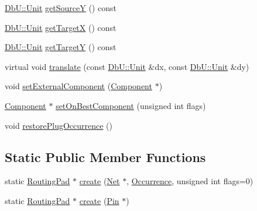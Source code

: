 \begin{DoxyCompactItemize}
\item 
\mbox{\hyperlink{group__DbUGroup_ga4fbfa3e8c89347af76c9628ea06c4146}{Db\+U\+::\+Unit}} \mbox{\hyperlink{classHurricane_1_1RoutingPad_a75983ff3507f4cbf2aaa4e3132eac987}{get\+SourceY}} () const
\item 
\mbox{\hyperlink{group__DbUGroup_ga4fbfa3e8c89347af76c9628ea06c4146}{Db\+U\+::\+Unit}} \mbox{\hyperlink{classHurricane_1_1RoutingPad_a3c0f5056b20515d308c2945ab692bce5}{get\+TargetX}} () const
\item 
\mbox{\hyperlink{group__DbUGroup_ga4fbfa3e8c89347af76c9628ea06c4146}{Db\+U\+::\+Unit}} \mbox{\hyperlink{classHurricane_1_1RoutingPad_a41a9c831d668377fc0c5e628f66465a0}{get\+TargetY}} () const
\item 
virtual void \mbox{\hyperlink{classHurricane_1_1RoutingPad_a41bf66ffda0c0ceaaebc67acd72d5b36}{translate}} (const \mbox{\hyperlink{group__DbUGroup_ga4fbfa3e8c89347af76c9628ea06c4146}{Db\+U\+::\+Unit}} \&dx, const \mbox{\hyperlink{group__DbUGroup_ga4fbfa3e8c89347af76c9628ea06c4146}{Db\+U\+::\+Unit}} \&dy)
\item 
void \mbox{\hyperlink{classHurricane_1_1RoutingPad_a9f448ad4f05f6995edc4a5ab50501586}{set\+External\+Component}} (\mbox{\hyperlink{classHurricane_1_1Component}{Component}} $\ast$)
\item 
\mbox{\hyperlink{classHurricane_1_1Component}{Component}} $\ast$ \mbox{\hyperlink{classHurricane_1_1RoutingPad_a410992ef75c40f9a898c36f39a7d1a1a}{set\+On\+Best\+Component}} (unsigned int flags)
\item 
void \mbox{\hyperlink{classHurricane_1_1RoutingPad_a1fcb0951f5f9505c6978bf498f78fce9}{restore\+Plug\+Occurrence}} ()
\end{DoxyCompactItemize}
\subsection*{Static Public Member Functions}
\begin{DoxyCompactItemize}
\item 
static \mbox{\hyperlink{classHurricane_1_1RoutingPad}{Routing\+Pad}} $\ast$ \mbox{\hyperlink{classHurricane_1_1RoutingPad_a87c3a286477f81b9c791dc24104a3e51}{create}} (\mbox{\hyperlink{classHurricane_1_1Net}{Net}} $\ast$, \mbox{\hyperlink{classHurricane_1_1Occurrence}{Occurrence}}, unsigned int flags=0)
\item 
static \mbox{\hyperlink{classHurricane_1_1RoutingPad}{Routing\+Pad}} $\ast$ \mbox{\hyperlink{classHurricane_1_1RoutingPad_a1883e5711b5700cd7d1024f1cff6abb0}{create}} (\mbox{\hyperlink{classHurricane_1_1Pin}{Pin}} $\ast$)
\end{DoxyCompactItemize}


